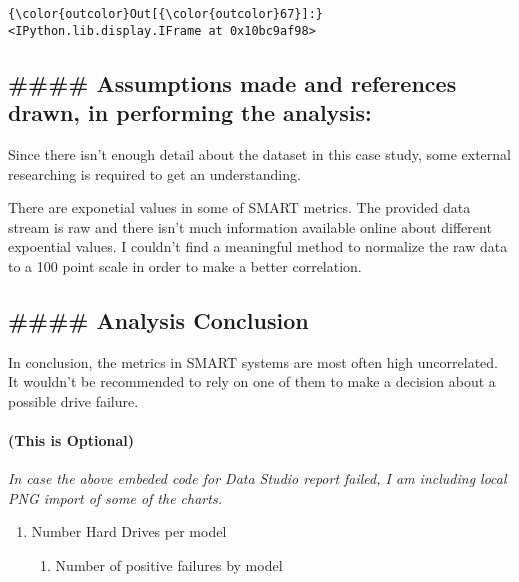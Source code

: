 \documentclass[11pt]{article}
\providecommand{\tightlist}{%
      \setlength{\itemsep}{0pt}\setlength{\parskip}{0pt}}
\begin{document}
\begin{Verbatim}[commandchars=\\\{\}]
{\color{outcolor}Out[{\color{outcolor}67}]:} <IPython.lib.display.IFrame at 0x10bc9af98>
\end{Verbatim}
            
    \subsection{\#\#\#\# Assumptions made and references drawn, in
performing the
analysis:}\label{assumptions-made-and-references-drawn-in-performing-the-analysis}

Since there isn't enough detail about the dataset in this case study,
some external researching is required to get an understanding.

There are exponetial values in some of SMART metrics. The provided data
stream is raw and there isn't much information available online about
different expoential values. I couldn't find a meaningful method to
normalize the raw data to a 100 point scale in order to make a better
correlation.

\subsection{\#\#\#\# Analysis Conclusion}\label{analysis-conclusion}

In conclusion, the metrics in SMART systems are most often high
uncorrelated. It wouldn't be recommended to rely on one of them to make
a decision about a possible drive failure.

    \paragraph{(This is Optional)}\label{this-is-optional}

\emph{In case the above embeded code for Data Studio report failed, I am
including local PNG import of some of the charts.}

\begin{enumerate}
\def\labelenumi{\arabic{enumi}.}
\tightlist
\item
  Number Hard Drives per model

  \begin{enumerate}
  \def\labelenumii{\arabic{enumii}.}
  \setcounter{enumii}{1}
  \tightlist
  \item
    Number of positive failures by model 
  \end{enumerate}
\end{enumerate}
\end{document}
